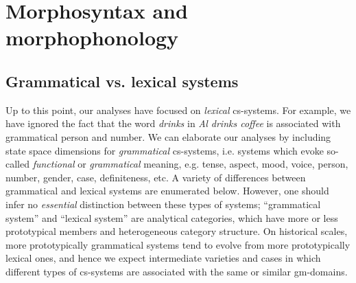 \section{Morphosyntax and morphophonology}
\rohead{\headmark}
\subsection{Grammatical vs. lexical systems}

Up to this point, our analyses have focused on \textit{lexical} cs-systems. For example, we have ignored the fact that the word \textit{drinks} in \textit{Al drinks coffee} is associated with grammatical person and number. We can elaborate our analyses by including state space dimensions for \textit{grammatical} cs-systems, i.e. systems which evoke so-called \textit{functional} or \textit{grammatical} meaning, e.g. tense, aspect, mood, voice, person, number, gender, case, definiteness, etc. A variety of differences between grammatical and lexical systems are enumerated below. However, one should infer no \textit{essential} distinction between these types of systems; “grammatical system” and “lexical system” are analytical categories, which have more or less prototypical members and heterogeneous category structure. On historical scales, more prototypically grammatical systems tend to evolve from more prototypically lexical ones, and hence we expect intermediate varieties and cases in which different types of cs-systems are associated with the same or similar gm-domains. 
